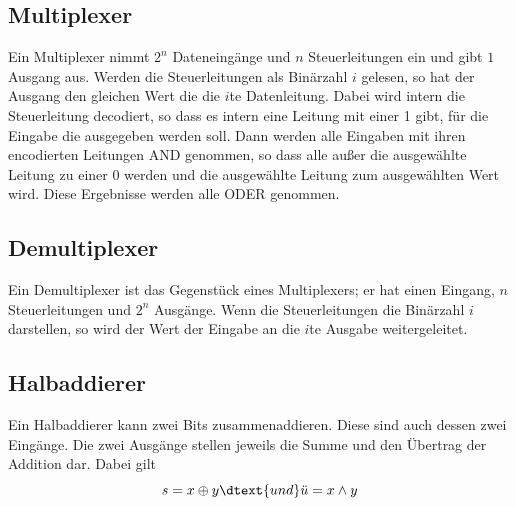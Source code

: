 \documentclass{article}
\begin{document}
\subsection{Multiplexer}
Ein Multiplexer nimmt $2^n$ Dateneingänge und $n$ Steuerleitungen ein und gibt $1$ Ausgang aus. Werden die Steuerleitungen als Binärzahl $i$ gelesen, so hat der Ausgang den gleichen Wert die die $i$te Datenleitung.
Dabei wird intern die Steuerleitung decodiert, so dass es intern eine Leitung mit einer 1 gibt, für die Eingabe die ausgegeben werden soll. Dann werden alle Eingaben mit ihren encodierten Leitungen AND genommen, so dass alle außer die ausgewählte Leitung zu einer 0 werden und die ausgewählte Leitung zum ausgewählten Wert wird. Diese Ergebnisse werden alle ODER genommen.

\subsection{Demultiplexer}
Ein Demultiplexer ist das Gegenstück eines Multiplexers; er hat einen Eingang, $n$ Steuerleitungen und $2^n$ Ausgänge. Wenn die Steuerleitungen die Binärzahl $i$ darstellen, so wird der Wert der Eingabe an die $i$te Ausgabe weitergeleitet.

\subsection{Halbaddierer}
Ein Halbaddierer kann zwei Bits zusammenaddieren. Diese sind auch dessen zwei Eingänge. Die zwei Ausgänge stellen jeweils die Summe und den Übertrag der Addition dar.
Dabei gilt
\[
 s = x \oplus y \dtext{und} \ddot{u} = x \land y
\]
\end{document}
